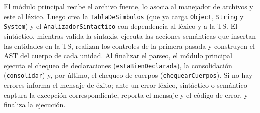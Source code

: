 \documentclass[11pt,a4paper]{article}
\begin{document}
El módulo principal recibe el archivo fuente, lo asocia al manejador de archivos y
este al léxico. Luego crea la \texttt{TablaDeSimbolos} (que ya carga
\texttt{Object}, \texttt{String} y \texttt{System}) y el
\texttt{AnalizadorSintactico} con dependencia al léxico y a la TS. El sintáctico,
mientras valida la sintaxis, ejecuta las acciones semánticas que insertan las
entidades en la TS, realizan los controles de la primera pasada y construyen el
AST del cuerpo de cada unidad. Al finalizar el parseo, el módulo principal ejecuta
el chequeo de declaraciones (\texttt{estaBienDeclarada}), la consolidación
(\texttt{consolidar}) y, por último, el chequeo de cuerpos
(\texttt{chequearCuerpos}). Si no hay errores informa el mensaje de éxito; ante un
error léxico, sintáctico o semántico captura la excepción correspondiente, reporta
el mensaje y el código de error, y finaliza la ejecución.
\end{document}
